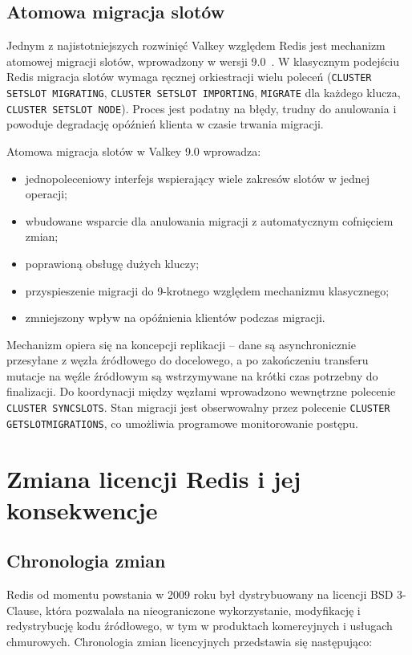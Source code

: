 \subsection{Atomowa migracja slotów}

Jednym z najistotniejszych rozwinięć Valkey względem Redis jest mechanizm atomowej migracji slotów, wprowadzony w wersji 9.0~\cite{valkeyAtomicSlotMigration}. W klasycznym podejściu Redis migracja slotów wymaga ręcznej orkiestracji wielu poleceń (\texttt{CLUSTER SETSLOT MIGRATING}, \texttt{CLUSTER SETSLOT IMPORTING}, \texttt{MIGRATE} dla każdego klucza, \texttt{CLUSTER SETSLOT NODE}). Proces jest podatny na błędy, trudny do anulowania i powoduje degradację opóźnień klienta w czasie trwania migracji.

Atomowa migracja slotów w Valkey 9.0 wprowadza:

\begin{itemize}
    \item jednopoleceniowy interfejs wspierający wiele zakresów slotów w jednej operacji;
    \item wbudowane wsparcie dla anulowania migracji z automatycznym cofnięciem zmian;
    \item poprawioną obsługę dużych kluczy;
    \item przyspieszenie migracji do 9-krotnego względem mechanizmu klasycznego;
    \item zmniejszony wpływ na opóźnienia klientów podczas migracji.
\end{itemize}

Mechanizm opiera się na koncepcji replikacji -- dane są asynchronicznie przesyłane z węzła źródłowego do docelowego, a po zakończeniu transferu mutacje na węźle źródłowym są wstrzymywane na krótki czas potrzebny do finalizacji. Do koordynacji między węzłami wprowadzono wewnętrzne polecenie \texttt{CLUSTER SYNCSLOTS}. Stan migracji jest obserwowalny przez polecenie \texttt{CLUSTER GETSLOTMIGRATIONS}, co umożliwia programowe monitorowanie postępu.

\section{Zmiana licencji Redis i jej konsekwencje}\label{sec:licencja}

\subsection{Chronologia zmian}

Redis od momentu powstania w 2009 roku był dystrybuowany na licencji BSD 3-Clause, która pozwalała na nieograniczone wykorzystanie, modyfikację i redystrybucję kodu źródłowego, w tym w produktach komercyjnych i usługach chmurowych. Chronologia zmian licencyjnych przedstawia się następująco:

